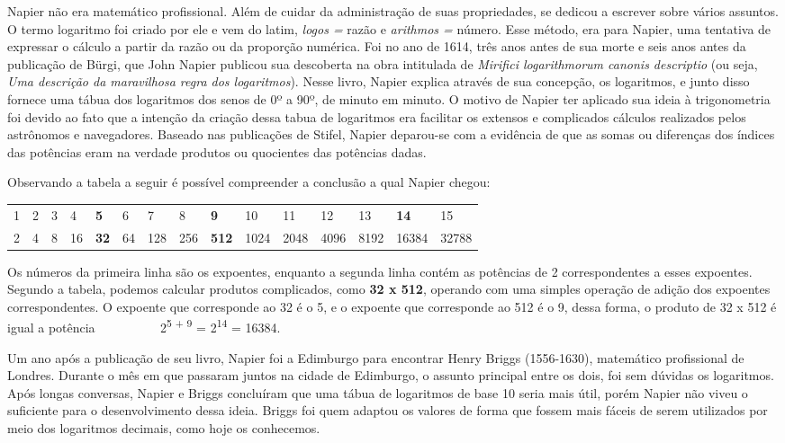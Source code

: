 Napier não era matemático profissional. Além de cuidar da administração de suas propriedades, se dedicou a escrever sobre vários assuntos. O termo logaritmo foi criado por ele e vem do latim, \textit{logos = }razão e \textit{arithmos =} número.\textit{ }Esse método, era para Napier, uma tentativa de expressar o cálculo a partir da razão ou da proporção numérica. Foi no ano de 1614, três anos antes de sua morte e seis anos antes da publicação de Bürgi, que John Napier publicou sua descoberta na obra intitulada de \textit{Mirifici logarithmorum canonis descriptio} (ou seja, \textit{Uma descrição da maravilhosa regra dos logaritmos}). Nesse livro, Napier explica através de sua concepção, os logaritmos, e junto disso fornece uma tábua dos logaritmos dos senos de 0º a 90º, de minuto em minuto. O motivo de Napier ter aplicado sua ideia à trigonometria foi devido ao fato que a intenção da criação dessa tabua de logaritmos era facilitar os extensos e complicados cálculos realizados pelos astrônomos e navegadores. Baseado nas publicações de Stifel, Napier deparou-se com a evidência de que as somas ou diferenças dos índices das potências eram na verdade produtos ou quocientes das potências dadas.

Observando a tabela a seguir é possível compreender a conclusão a qual Napier chegou: 

\begin{table}[H]
    \centering
    \begin{tabular}{lllllllllllllll}
    1 & 2 & 3 & 4  & \textbf{5}  & 6  & 7   & 8   & \textbf{9}   & 10   & 11   & 12   & 13   & \textbf{14} & 15    \\
    2 & 4 & 8 & 16 & \textbf{32} & 64 & 128 & 256 & \textbf{512} & 1024 & 2048 & 4096 & 8192 & 16384       & 32788
    \end{tabular}
\end{table}

Os números da primeira linha são os expoentes, enquanto a segunda linha contém as potências de 2 correspondentes a esses expoentes. Segundo a tabela, podemos calcular produtos complicados, como \textbf{32 x 512}, operando com uma simples operação de adição dos expoentes correspondentes. O expoente que corresponde ao 32 é o 5, e o expoente que corresponde ao 512 é o 9, dessa forma, o produto de 32 x 512 é igual a potência ~~~~~~~~~ 2\textsuperscript{5 + 9 }= 2\textsuperscript{14} = 16384.

Um ano após a publicação de seu livro, Napier foi a Edimburgo para encontrar Henry Briggs (1556-1630), matemático profissional de Londres. Durante o mês em que passaram juntos na cidade de Edimburgo, o assunto principal entre os dois, foi sem dúvidas os logaritmos. Após longas conversas, Napier e Briggs concluíram que uma tábua de logaritmos de base 10 seria mais útil, porém Napier não viveu o suficiente para o desenvolvimento dessa ideia. Briggs foi quem adaptou os valores de forma que fossem mais fáceis de serem utilizados por meio dos logaritmos decimais, como hoje os conhecemos.

